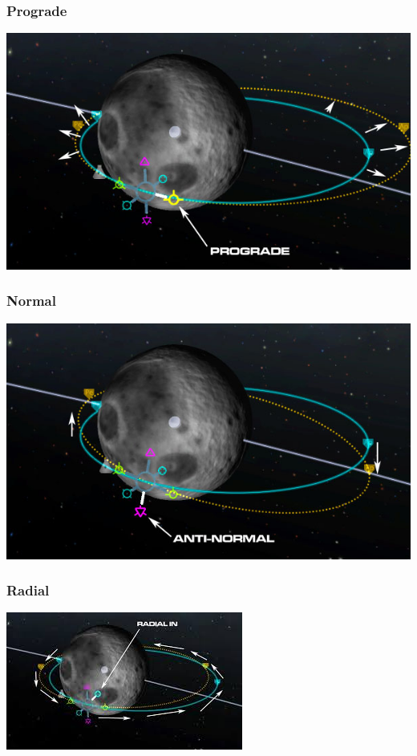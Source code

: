 \begin{frame}
    \frametitle{Prograde}
    \begin{center}
        \includegraphics[scale=0.5]{images/prograde}
    \end{center}
\end{frame}
\begin{frame}
    \frametitle{Normal}
    \begin{center}
        \includegraphics[scale=0.5]{images/anti_normal}
    \end{center}
\end{frame}
\begin{frame}
    \frametitle{Radial}
    \begin{center}
        \includegraphics[]{images/radial}
    \end{center}
\end{frame}
